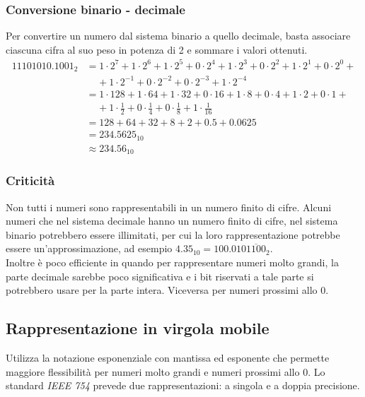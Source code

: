 \documentclass[a4paper]{article}
\begin{document}
\subsubsection*{Conversione binario - decimale}
Per convertire un numero dal sistema binario a quello decimale, basta associare ciascuna cifra al suo peso in potenza
di 2 e sommare i valori ottenuti.
\begin{align*}
	11101010.1001_2 &= 1 \cdot 2 ^ 7 + 1 \cdot 2 ^ 6 + 1 \cdot 2 ^ 5 + 0 \cdot 2 ^ 4 + 1 \cdot 2 ^ 3 + 0 \cdot 2 ^ 2 + 1 \cdot 2 ^ 1 + 0 \cdot 2 ^ 0 + \\
	&\;\;\;\; + 1 \cdot 2 ^{-1} + 0 \cdot 2 ^{-2} + 0 \cdot 2 ^{-3} + 1 \cdot 2 ^{-4} \\
	&=  1 \cdot 128 + 1 \cdot 64 + 1 \cdot 32 + 0 \cdot 16 + 1 \cdot 8 + 0 \cdot 4 + 1 \cdot 2 + 0 \cdot 1 + \\
	&\;\;\;\; + 1 \cdot \frac{1}{2} + 0 \cdot \frac{1}{4} + 0 \cdot \frac{1}{8} + 1 \cdot \frac{1}{16} \\
	&= 128 + 64 + 32 + 8 + 2 + 0.5 + 0.0625\\
	&= 234.5625_{10} \\
	&\approx 234.56_{10}
\end{align*}

\subsubsection*{Criticità}
Non tutti i numeri sono rappresentabili in un numero finito di cifre. Alcuni numeri che nel sistema decimale hanno un
numero finito di cifre, nel sistema binario potrebbero essere illimitati, per cui la loro rappresentazione potrebbe
essere un'approssimazione, ad esempio \(4.35_{10} = 100.010\overline{1100}_2\). \\
Inoltre è poco efficiente in quando per rappresentare numeri molto grandi, la parte decimale sarebbe poco significativa
e i bit riservati a tale parte si potrebbero usare per la parte intera. Viceversa per numeri prossimi allo 0.

\newpage


\subsection{Rappresentazione in virgola mobile}
Utilizza la notazione esponenziale con mantissa ed esponente che permette maggiore flessibilità per numeri molto grandi
e numeri prossimi allo 0. Lo standard \textit{IEEE 754} prevede due rappresentazioni: a singola e a doppia precisione.
\end{document}
